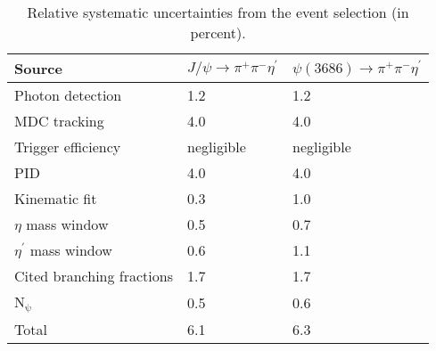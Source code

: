 \documentclass[twocolumn,showpacs,aps,prd]{revtex4-1}
\newcommand{\etap}{\eta^{\prime}}
\newcommand{\psip}{\psi(3686)}
\begin{document}
\begin{table}[tb]
\begin{center}
 \caption{Relative systematic uncertainties from the event selection (in percent).}
  \label{err_Evt}
  \setlength{\extrarowheight}{1.0ex}
  \renewcommand{\arraystretch}{1.0}
  \vspace{0.2cm}
  \begin{tabular}{p{3.8cm}m{2.3cm}<{\centering}m{2.0cm}<{\centering}}
  \hline\hline
  Source                                    &$J/\psi\to \pi^+\pi^-\eta^\prime$  &$\psip\to \pi^+\pi^-\eta^\prime$  \\ \hline
  Photon detection                          &1.2                                &1.2              \\
  MDC tracking                              &4.0                                &4.0            \\
  Trigger efficiency                        &negligible                         &negligible \\
  PID                                       &4.0                                &4.0            \\
  Kinematic fit                             &0.3                                &1.0            \\
  $\eta$ mass window                        &0.5                                &0.7             \\
  $\etap$ mass window                       &0.6                                &1.1             \\
  Cited branching fractions                 &1.7                                &1.7             \\
  N$_{\mathrm{\psi}}$                       &0.5                                &0.6              \\\hline
  Total                                     &6.1                                &6.3             \\
  \hline\hline
  \end{tabular}
  \vspace{-0.2cm}
  \end{center}
\end{table}
%
\end{document}
